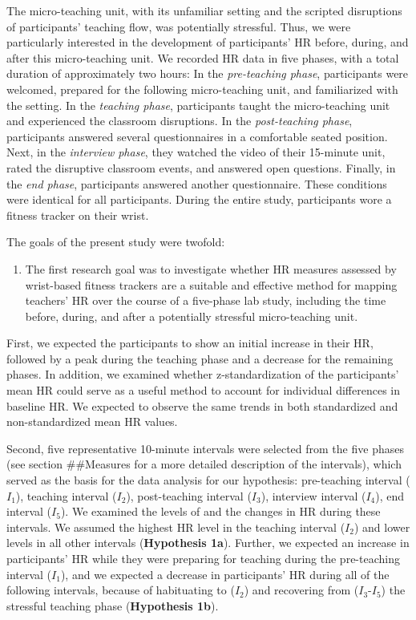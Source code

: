 \documentclass[]{elsarticle} %
\providecommand{\tightlist}{%
  \setlength{\itemsep}{0pt}\setlength{\parskip}{0pt}}
\begin{document}
The micro-teaching unit, with its unfamiliar setting and the scripted
disruptions of participants' teaching flow, was potentially stressful.
Thus, we were particularly interested in the development of
participants' HR before, during, and after this micro-teaching unit. We
recorded HR data in five phases, with a total duration of approximately
two hours: In the \emph{pre-teaching phase}, participants were welcomed,
prepared for the following micro-teaching unit, and familiarized with
the setting. In the \emph{teaching phase}, participants taught the
micro-teaching unit and experienced the classroom disruptions. In the
\emph{post-teaching phase}, participants answered several questionnaires
in a comfortable seated position. Next, in the \emph{interview phase},
they watched the video of their 15-minute unit, rated the disruptive
classroom events, and answered open questions. Finally, in the \emph{end
phase}, participants answered another questionnaire. These conditions
were identical for all participants. During the entire study,
participants wore a fitness tracker on their wrist.

The goals of the present study were twofold:

\begin{enumerate}
\def\labelenumi{(\arabic{enumi})}
\tightlist
\item
  The first research goal was to investigate whether HR measures
  assessed by wrist-based fitness trackers are a suitable and effective
  method for mapping teachers' HR over the course of a five-phase lab
  study, including the time before, during, and after a potentially
  stressful micro-teaching unit.
\end{enumerate}

First, we expected the participants to show an initial increase in their
HR, followed by a peak during the teaching phase and a decrease for the
remaining phases. In addition, we examined whether z-standardization of
the participants' mean HR could serve as a useful method to account for
individual differences in baseline HR. We expected to observe the same
trends in both standardized and non-standardized mean HR values.

Second, five representative 10-minute intervals were selected from the
five phases (see section \#\#Measures for a more detailed description of
the intervals), which served as the basis for the data analysis for our
hypothesis: pre-teaching interval (\(I_1\)), teaching interval
(\(I_2\)), post-teaching interval (\(I_3\)), interview interval
(\(I_4\)), end interval (\(I_5\)). We examined the levels of and the
changes in HR during these intervals. We assumed the highest HR level in
the teaching interval (\(I_2\)) and lower levels in all other intervals
(\textbf{Hypothesis 1a}). Further, we expected an increase in
participants' HR while they were preparing for teaching during the
pre-teaching interval (\(I_1\)), and we expected a decrease in
participants' HR during all of the following intervals, because of
habituating to (\(I_2\)) and recovering from (\(I_3\)-\(I_5\)) the
stressful teaching phase (\textbf{Hypothesis 1b}).
\end{document}
